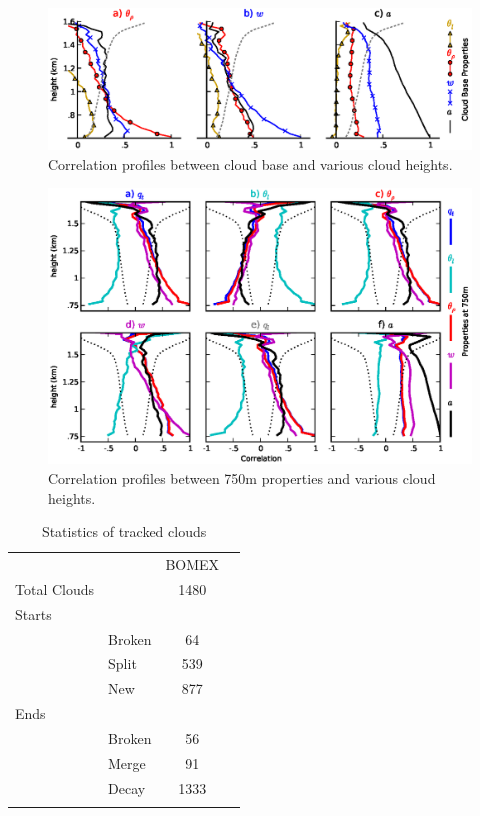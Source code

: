 \documentclass[acp]{copernicus}
\begin{document}
\begin{figure}[t]
\vspace*{2mm}
\begin{center}
\includegraphics[width=\textwidth]{./figures/cloud_base_profiles}
\end{center}
\caption{Correlation profiles between cloud base and various cloud heights.}
\label{fig:cloud_base_profiles}
\end{figure}

\begin{figure}[t]
\vspace*{2mm}
\begin{center}
\includegraphics[width=\textwidth]{./figures/750m_profiles}
\end{center}
\caption{Correlation profiles between 750m properties and various cloud heights.}
\label{fig:750m_profiles}
\end{figure}





\begin{table}[t]
\caption{Statistics of tracked clouds}
\vskip4mm
\centering
\begin{tabular}{llcr}
\tophline
&&BOMEX\\
\middlehline
Total Clouds&&1480\\
Starts\\
&Broken&64\\
&Split&539\\
&New&877\\
Ends\\
&Broken&56\\
&Merge&91\\
&Decay&1333\\

\bottomhline
\end{tabular}
\end{table}
\end{document}
